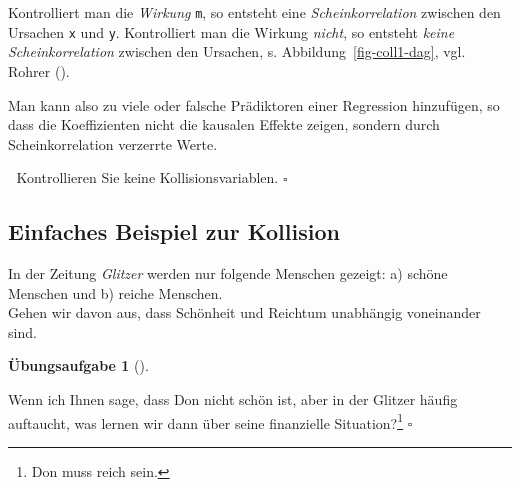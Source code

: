 \documentclass[
  ngerman,
  letterpaper,
  twoside,
  open=any]{scrbook}
\theoremstyle{definition}
\theoremstyle{plain}
\theoremstyle{definition}
\newtheorem{exercise}{Übungsaufgabe}[chapter]
\theoremstyle{definition}
\theoremstyle{definition}
\theoremstyle{definition}
\newtheorem{exercise}{Übungsaufgabe}[chapter]
\theoremstyle{remark}
\begin{document}
Kontrolliert man die \emph{Wirkung} \texttt{m}, so entsteht eine
\emph{Scheinkorrelation} zwischen den Ursachen \texttt{x} und
\texttt{y}. Kontrolliert man die Wirkung \emph{nicht}, so entsteht
\emph{keine Scheinkorrelation} zwischen den Ursachen, s.
Abbildung~\ref{fig-coll1-dag}, vgl. Rohrer
().

\begin{tcolorbox}[enhanced jigsaw, arc=.35mm, bottomrule=.15mm, bottomtitle=1mm, breakable, colback=white, colbacktitle=quarto-callout-important-color!10!white, colframe=quarto-callout-important-color-frame, coltitle=black, left=2mm, leftrule=.75mm, opacityback=0, opacitybacktitle=0.6, rightrule=.15mm, title=\textcolor{quarto-callout-important-color}{\faExclamation}\hspace{0.5em}{Wichtig}, titlerule=0mm, toprule=.15mm, toptitle=1mm]

Man kann also zu viele oder falsche Prädiktoren einer Regression
hinzufügen, so dass die Koeffizienten nicht die kausalen Effekte zeigen,
sondern durch Scheinkorrelation verzerrte Werte.

\end{tcolorbox}

\begin{tcolorbox}[enhanced jigsaw, arc=.35mm, bottomrule=.15mm, bottomtitle=1mm, breakable, colback=white, colbacktitle=quarto-callout-tip-color!10!white, colframe=quarto-callout-tip-color-frame, coltitle=black, left=2mm, leftrule=.75mm, opacityback=0, opacitybacktitle=0.6, rightrule=.15mm, title=\textcolor{quarto-callout-tip-color}{\faLightbulb}\hspace{0.5em}{Tipp}, titlerule=0mm, toprule=.15mm, toptitle=1mm]

🙅 Kontrollieren Sie keine Kollisionsvariablen. \(\square\)

\end{tcolorbox}

\subsection{Einfaches Beispiel zur
Kollision}\label{einfaches-beispiel-zur-kollision}

In der Zeitung \emph{Glitzer} werden nur folgende Menschen gezeigt: a)
schöne Menschen und b) reiche Menschen.\\
Gehen wir davon aus, dass Schönheit und Reichtum unabhängig voneinander
sind.

\begin{exercise}[]\protect\hypertarget{exr-coll1}{}\label{exr-coll1}

Wenn ich Ihnen sage, dass Don nicht schön ist, aber in der Glitzer
häufig auftaucht, was lernen wir dann über seine finanzielle
Situation?\footnote{Don muss reich sein.} \(\square\)

\end{exercise}
\end{document}
